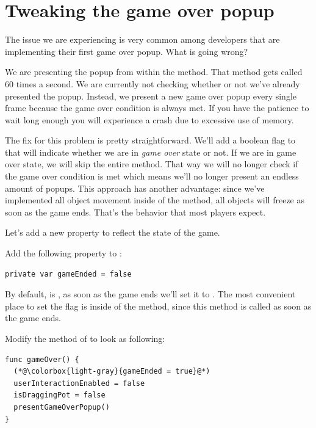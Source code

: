 \section{Tweaking the game over popup}
The issue we are experiencing is very common among developers that are
implementing their first game over popup. What is going wrong?

We are presenting the popup from within the  method. That
method gets called 60 times a second. We are currently not checking whether or not we've already presented the popup. 
Instead, we present a new game over popup every single frame because the game
over condition is always met. If you have the
patience to wait long enough you will experience a crash due to excessive use of
memory.

The fix for this problem is pretty straightforward. We'll add a boolean flag to
 that will indicate whether we are in \textit{game over}
state or not. If we are in game over state, we will skip the entire
 method. That way we will no longer check if the game over
condition is met which means we'll no longer present an endless amount of
popups. This approach has another advantage: since we've implemented all object
movement inside of the  method, all objects will freeze as
soon as the game ends. That's the behavior that most players expect. 

Let's add a new property to reflect the state of the game.

\begin{leftbar}
Add the following property to :
\begin{lstlisting}
private var gameEnded = false
\end{lstlisting}
\end{leftbar}

By default,  is , as soon as the game
ends we'll set it to . The most convenient place to set the
flag is inside of the  method, since this method is called
as soon as the game ends.

\begin{leftbar}
Modify the  method of  to look as
following:
\begin{lstlisting}
func gameOver() {
  (*@\colorbox{light-gray}{gameEnded = true}@*)
  userInteractionEnabled = false
  isDraggingPot = false
  presentGameOverPopup()
}
\end{lstlisting}
\end{leftbar}

